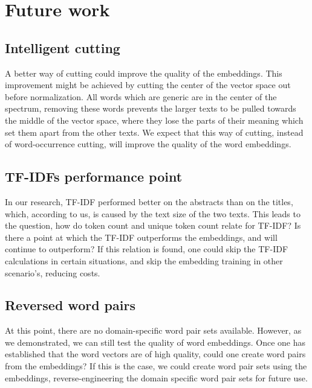 \documentclass[../../Thesis.tex]{subfiles}
\begin{document}
\section{Future work}
\subsection{Intelligent cutting}
A better way of cutting could improve the quality of the embeddings. This improvement might be achieved by cutting the center of the vector space out before normalization. All words which are generic are in the center of the spectrum, removing these words prevents the larger texts to be pulled towards the middle of the vector space, where they lose the parts of their meaning which set them apart from the other texts. We expect that this way of cutting, instead of word-occurrence cutting, will improve the quality of the word embeddings.
\subsection{TF-IDFs performance point}
In our research, TF-IDF performed better on the abstracts than on the titles, which, according to us, is caused by the text size of the two texts. This leads to the question, how do token count and unique token count relate for TF-IDF? Is there a point at which the TF-IDF outperforms the embeddings, and will continue to outperform? If this relation is found, one could skip the TF-IDF calculations in certain situations, and skip the embedding training in other scenario's, reducing costs.
\subsection{Reversed word pairs}
At this point, there are no domain-specific word pair sets available. However, as we demonstrated, we can still test the quality of word embeddings. Once one has established that the word vectors are of high quality, could one create word pairs from the embeddings? If this is the case, we could create word pair sets using the embeddings, reverse-engineering the domain specific word pair sets for future use.
\end{document}
